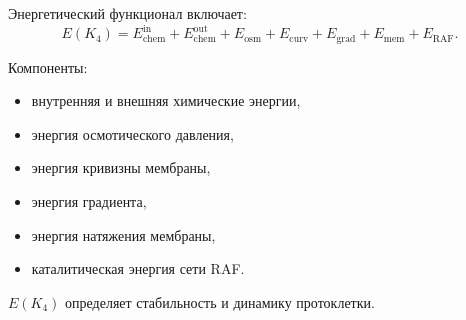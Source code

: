 Энергетический функционал включает:
\[
E(K_4) =
E_{\mathrm{chem}}^{\mathrm{in}} + E_{\mathrm{chem}}^{\mathrm{out}}
+ E_{\mathrm{osm}} + E_{\mathrm{curv}}
+ E_{\mathrm{grad}} + E_{\mathrm{mem}}
+ E_{\mathrm{RAF}}.
\]

Компоненты:
\begin{itemize}
    \item внутренняя и внешняя химические энергии,
    \item энергия осмотического давления,
    \item энергия кривизны мембраны,
    \item энергия градиента,
    \item энергия натяжения мембраны,
    \item каталитическая энергия сети RAF.
\end{itemize}

$E(K_4)$ определяет стабильность и динамику протоклетки.

